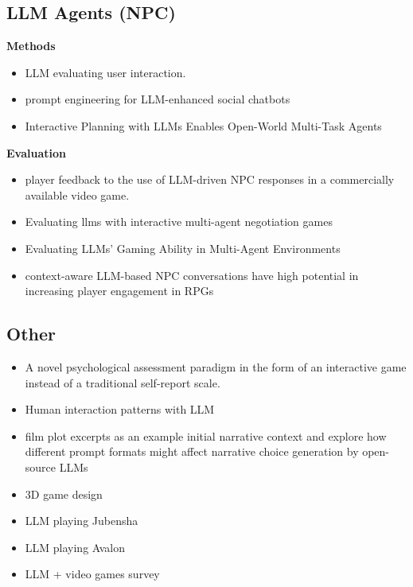 \subsection{LLM Agents (NPC)}
\noindent \textbf{Methods}
\begin{itemize}
    \item LLM evaluating user interaction.\cite{isaza2024prompt}
    \item prompt engineering for LLM-enhanced social chatbots \cite{sun2023fictional}
    \item Interactive Planning with LLMs Enables Open-World Multi-Task Agents


\end{itemize}
\noindent \textbf{Evaluation}
\begin{itemize}
    \item  player feedback to the use of LLM-driven NPC responses in a commercially available video game.\cite{cox2023conversational}
        \item Evaluating llms with interactive multi-agent negotiation games \cite{abdelnabi2023llm}
        \item  Evaluating LLMs' Gaming Ability in Multi-Agent Environments \cite{huang2024far}
        \item context-aware LLM-based NPC conversations have high potential in increasing player engagement in RPGs \cite{csepregi2021effect}
\end{itemize}

\subsection{Other}

\begin{itemize}
    \item A novel psychological assessment paradigm in the form of an interactive
game instead of a traditional self-report scale.\cite{yang2024llm}
    \item Human interaction patterns with LLM\cite{li2024map}
    \item film plot excerpts as an example initial narrative context and explore how different prompt formats might affect narrative choice generation by open-source LLMs\cite{harmon2023prompt}

    
    \item 3D game design\cite{roberts2022surreal}
    \item LLM playing Jubensha\cite{wu2023deciphering}
    \item LLM playing Avalon\cite{lan2023llm}
    \item LLM + video games survey \cite{sweetser2024large}
\end{itemize}

